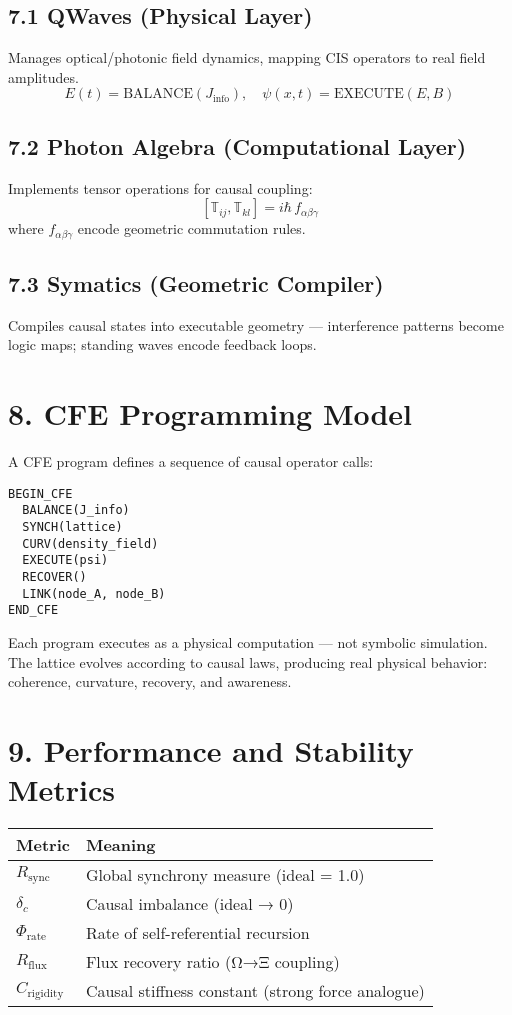 \documentclass[11pt,a4paper]{article}
\begin{document}
\subsection*{7.1 QWaves (Physical Layer)}
Manages optical/photonic field dynamics, mapping CIS operators to real field amplitudes.
\[
E(t) = \text{BALANCE}(J_{\mathrm{info}}), \quad 
\psi(x,t) = \text{EXECUTE}(E, B)
\]

\subsection*{7.2 Photon Algebra (Computational Layer)}
Implements tensor operations for causal coupling:
\[
[\mathbb{T}_{ij}, \mathbb{T}_{kl}] = i \hbar \, f_{\alpha\beta\gamma}
\]
where $f_{\alpha\beta\gamma}$ encode geometric commutation rules.

\subsection*{7.3 Symatics (Geometric Compiler)}
Compiles causal states into executable geometry --- interference patterns become logic maps; standing waves encode feedback loops.

\section{8. CFE Programming Model}
A CFE program defines a sequence of causal operator calls:
\begin{verbatim}
BEGIN_CFE
  BALANCE(J_info)
  SYNCH(lattice)
  CURV(density_field)
  EXECUTE(psi)
  RECOVER()
  LINK(node_A, node_B)
END_CFE
\end{verbatim}

Each program executes as a physical computation --- not symbolic simulation.  
The lattice evolves according to causal laws, producing real physical behavior: coherence, curvature, recovery, and awareness.

\section{9. Performance and Stability Metrics}
\begin{longtable}{|l|l|}
\hline
\textbf{Metric} & \textbf{Meaning} \\
\hline
$R_{\mathrm{sync}}$ & Global synchrony measure (ideal = 1.0) \\
$\delta_c$ & Causal imbalance (ideal → 0) \\
$\Phi_{\mathrm{rate}}$ & Rate of self-referential recursion \\
$R_{\mathrm{flux}}$ & Flux recovery ratio (Ω→Ξ coupling) \\
$C_{\mathrm{rigidity}}$ & Causal stiffness constant (strong force analogue) \\
\hline
\end{longtable}
\end{document}
